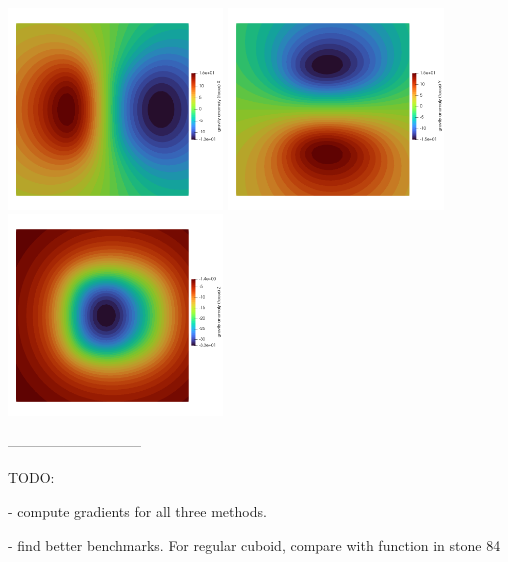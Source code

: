 \begin{center}
\includegraphics[width=5.7cm]{python_codes/fieldstone_113/results/hex_test5/gx}
\includegraphics[width=5.7cm]{python_codes/fieldstone_113/results/hex_test5/gy}
\includegraphics[width=5.7cm]{python_codes/fieldstone_113/results/hex_test5/gz}
\end{center}



-----------------------------

TODO:


- compute gradients for all three methods.

- find better benchmarks. For regular cuboid, compare with function in stone 84

